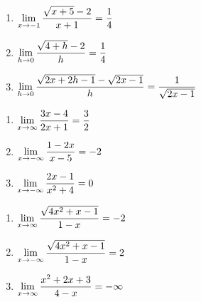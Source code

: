 \documentclass{ximera}
\begin{document}
\begin{enumerate}
\setcounter{enumi}{\value{HW}}

 \item  $\ds{ \lim_{x \rightarrow -1} \dfrac{\sqrt{x+5} - 2 }{x+1}  = \frac{1}{4}}$  
 
 \medskip
 
 \item $\ds{\lim_{h \rightarrow 0} \dfrac{\sqrt{4+h} - 2}{h}} = \frac{1}{4}$
 
 \medskip
   
 \item  $\ds{ \lim_{h \rightarrow 0} \dfrac{\sqrt{2x+2h-1} - \sqrt{2x-1} }{h}  = \frac{1}{\sqrt{2x-1}}}$  

\medskip

\setcounter{HW}{\value{enumi}}
\end{enumerate}

\begin{enumerate}
\setcounter{enumi}{\value{HW}}

\item  $\ds{ \lim_{x \rightarrow \infty} \dfrac{3x-4}{2x+1} = \frac{3}{2}}$

\medskip

\item $\ds{ \lim_{x \rightarrow -\infty}  \dfrac{1-2x}{x-5} = -2}$ 

\medskip

\item $\ds{ \lim_{x \rightarrow -\infty}\dfrac{2x-1}{x^2+4} = 0}$

\medskip

\setcounter{HW}{\value{enumi}}
\end{enumerate}

\begin{enumerate}
\setcounter{enumi}{\value{HW}}
\item $\ds{ \lim_{x \rightarrow \infty}\dfrac{\sqrt{4x^2+x-1}}{1-x} = -2}$

\medskip

\item $\ds{ \lim_{x \rightarrow -\infty}\dfrac{\sqrt{4x^2+x-1}}{1-x}  = 2}$

\medskip

\item $\ds{ \lim_{x \rightarrow \infty} \dfrac{x^2+2x+3}{4-x} = -\infty}$

\medskip

\setcounter{HW}{\value{enumi}}
\end{enumerate}
\end{document}
